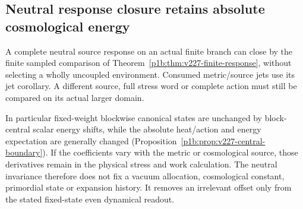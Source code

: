 \documentclass[12pt,a4paper]{article}
\begin{document}

\subsection{Neutral response closure retains absolute cosmological energy}
\label{p8:sec:v227-cosmology-centre}
A complete neutral source response on an actual finite branch can close
by the finite sampled comparison of
Theorem~\ref{p1b:thm:v227-finite-response}, without selecting a wholly
uncoupled environment. Consumed metric/source jets use its jet corollary.
A different source, full stress word or complete action must still be
compared on its actual larger domain.

In particular fixed-weight blockwise canonical states are unchanged by
block-central scalar energy shifts, while the absolute heat/action and
energy expectation are generally changed
(Proposition~\ref{p1b:prop:v227-central-boundary}). If the coefficients
vary with the metric or cosmological source, those derivatives remain
in the physical stress and work calculation. The neutral invariance
therefore does not fix a vacuum allocation, cosmological constant,
primordial state or expansion history. It removes an irrelevant offset
only from the stated fixed-state even dynamical readout.



\end{document}
